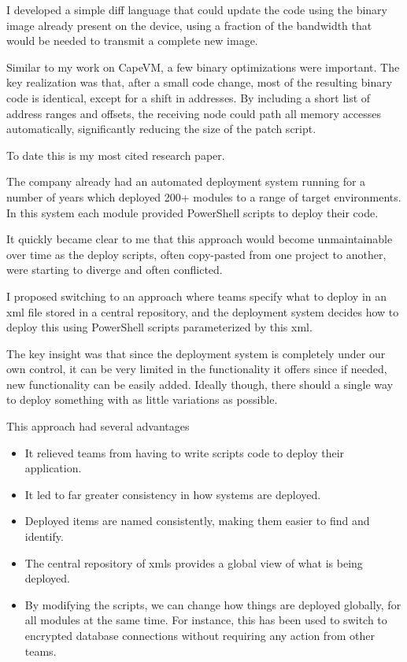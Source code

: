 \documentclass[10pt,a4paper]{../altacv}
\begin{document}
\begin{fullwidth}
I developed a simple diff language that could update the code using the binary image already present on the device, using a fraction of the bandwidth that would be needed to transmit a complete new image.

\medskip\medskip

Similar to my work on CapeVM, a few binary optimizations were important. The key realization was that, after a small code change, most of the resulting binary code is identical, except for a shift in addresses. By including a short list of address ranges and offsets, the receiving node could path all memory accesses automatically, significantly reducing the size of the patch script.

\medskip\medskip

To date this is my most cited research paper.

\bigskip\bigskip

The company already had an automated deployment system running for a number of years which deployed 200+ modules to a range of target environments. In this system each module provided PowerShell scripts to deploy their code.

\medskip\medskip

It quickly became clear to me that this approach would become unmaintainable over time as the deploy scripts, often copy-pasted from one project to another, were starting to diverge and often conflicted.

\medskip\medskip

I proposed switching to an approach where teams specify what to deploy in an xml file stored in a central repository, and the deployment system decides how to deploy this using PowerShell scripts parameterized by this xml.

\medskip\medskip

The key insight was that since the deployment system is completely under our own control, it can be very limited in the functionality it offers since if needed, new functionality can be easily added. Ideally though, there should a single way to deploy something with as little variations as possible.

\medskip\medskip

This approach had several advantages
\begin{itemize}
\item\small It relieved teams from having to write scripts code to deploy their application.
\item\small It led to far greater consistency in how systems are deployed.
\item\small Deployed items are named consistently, making them easier to find and identify.
\item\small The central repository of xmls provides a global view of what is being deployed.
\item\small By modifying the scripts, we can change how things are deployed globally, for all modules at the same time. For instance, this has been used to switch to encrypted database connections without requiring any action from other teams.
\end{itemize}


\end{fullwidth}
\end{document}
